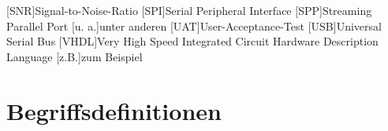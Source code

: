 \begin{acronym}[mosfetmosfet]
[SNR]{Signal-to-Noise-Ratio}
[SPI]{Serial Peripheral Interface}
[SPP]{Streaming Parallel Port}
[u. a.]{unter anderen}
[UAT]{User-Acceptance-Test}
[USB]{Universal Serial Bus}
[VHDL]{Very High Speed Integrated Circuit Hardware Description Language}
[z.B.]{zum Beispiel}


\end{acronym}




\newpage
\section{Begriffsdefinitionen}\label{sec:begriffe}

